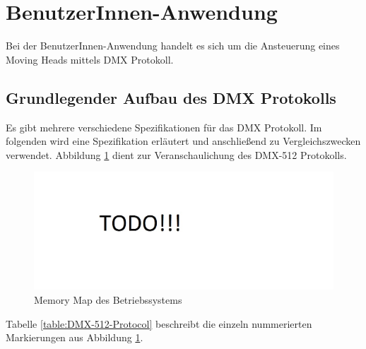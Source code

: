 \section{BenutzerInnen-Anwendung}

Bei der BenutzerInnen-Anwendung handelt es sich um die Ansteuerung eines Moving Heads mittels DMX Protokoll.  

\subsection{Grundlegender Aufbau des DMX Protokolls}
Es gibt mehrere verschiedene Spezifikationen für das DMX Protokoll. Im folgenden wird eine Spezifikation erläutert und anschließend zu Vergleichszwecken verwendet. Abbildung \ref{fig:DMX-512-Protocol} dient zur Veranschaulichung des DMX-512 Protokolls. 


\begin{figure}[H]
	\includegraphics[scale=0.60]{chapters/userapplication/figures/todo}
	\caption{Memory Map des Betriebssystems}
	\label{fig:DMX-512-Protocol}
\end{figure}

Tabelle \ref{table:DMX-512-Protocol} beschreibt die einzeln nummerierten Markierungen aus Abbildung \ref{fig:DMX-512-Protocol}.

